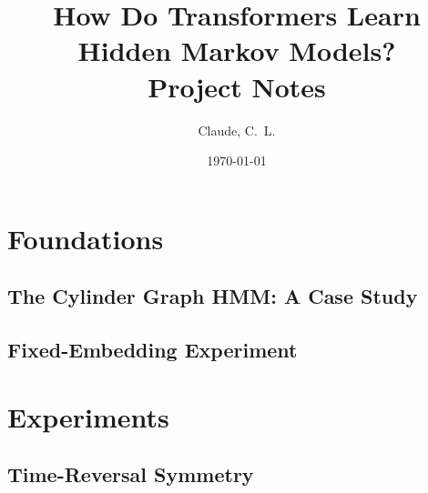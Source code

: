 \documentclass[11pt]{report}
\title{How Do Transformers Learn Hidden Markov Models?\\[0.3em]
       \large Project Notes}
\author{Claude, C.~L.}
\date{\today}
\begin{document}
\maketitle
\tableofcontents

\def\maketitle{}
\def\tableofcontents{}

\let\origappendix\appendix
\def\appendix{}

\part{Foundations}

\chapter{The Cylinder Graph HMM: A Case Study}


\chapter{Fixed-Embedding Experiment}


\part{Experiments}

\chapter{Time-Reversal Symmetry}

\end{document}
